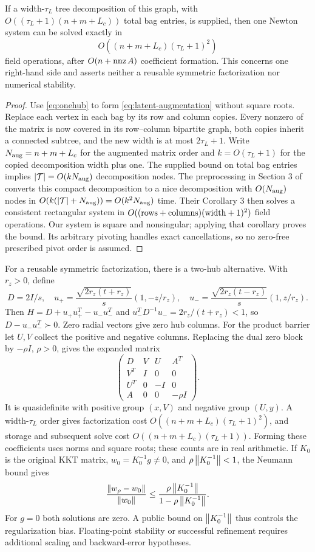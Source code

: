 \begin{proposition}\label{prop:latent-width}
If a width-$\tau_L$ tree decomposition of this graph, with
$O((\tau_L+1)(n+m+L_c))$ total bag entries, is supplied, then one Newton
system can be solved exactly in
\[
                 O((n+m+L_c)(\tau_L+1)^2)
\]
field operations, after $O(n+\operatorname{nnz} A)$ coefficient formation. This
concerns one right-hand side and asserts neither a reusable symmetric
factorization nor numerical stability.
\end{proposition}
\begin{proof}
Use \eqref{eq:onehub} to form \eqref{eq:latent-augmentation} without
square roots. Replace each vertex in each bag by its row and column
copies. Every nonzero of the matrix is now covered in its row--column
bipartite graph, both copies inherit a connected subtree, and the new
width is at most $2\tau_L+1$. Write $N_{\rm aug}=n+m+L_c$ for the
augmented matrix order and $k=O(\tau_L+1)$ for the copied decomposition
width plus one. The supplied bound on total bag entries implies
$|\mathcal T|=O(kN_{\rm aug})$ decomposition nodes.
The preprocessing in Section 3 of \citet{FurerHoppenTrevisan2025}
converts this compact decomposition to a nice decomposition with
$O(N_{\rm aug})$ nodes in
$O(k(|\mathcal T|+N_{\rm aug}))=O(k^2N_{\rm aug})$ time.
Their Corollary 3 then solves a consistent rectangular
system in $O((\hbox{rows}+\hbox{columns})(\hbox{width}+1)^2)$ field
operations. Our system is square and nonsingular; applying that corollary
proves the bound. Its arbitrary pivoting handles exact cancellations,
so no zero-free prescribed pivot order is assumed.
\end{proof}

For a reusable symmetric factorization, there is a two-hub alternative.
With $r_z>0$, define
\[
 D=2I/s,\quad
 u_+=\frac{\sqrt{2r_z(t+r_z)}}s(1,-z/r_z),\quad
 u_-=\frac{\sqrt{2r_z(t-r_z)}}s(1,z/r_z).
\]
Then $H=D+u_+u_+^T-u_-u_-^T$ and
$u_-^TD^{-1}u_-=2r_z/(t+r_z)<1$, so $D-u_-u_-^T\succ0$.
Zero radial vectors give zero hub columns. For the product barrier let
$U,V$ collect the positive and negative columns. Replacing the dual zero
block by $-\rho I$, $\rho>0$, gives the expanded matrix
\[
 \begin{pmatrix}
 D&V&U&A^T\\V^T&I&0&0\\U^T&0&-I&0\\A&0&0&-\rho I
 \end{pmatrix}.
\]
It is quasidefinite with positive group $(x,V)$ and negative group $(U,y)$.
A width-$\tau_L$ order gives factorization cost
$O((n+m+L_c)(\tau_L+1)^2)$, and storage and subsequent solve cost
$O((n+m+L_c)(\tau_L+1))$. Forming these coefficients uses norms and square
roots; these counts are in real arithmetic. If $K_0$ is the original KKT
matrix, $w_0=K_0^{-1}g\ne0$, and $\rho\left\lVert K_0^{-1}\right\rVert<1$, the Neumann
bound gives
\[
 \frac{\left\lVert w_\rho-w_0\right\rVert}{\left\lVert w_0\right\rVert}
 \leq\frac{\rho\left\lVert K_0^{-1}\right\rVert}{1-\rho\left\lVert K_0^{-1}\right\rVert}.
\]
For $g=0$ both solutions are zero. A public bound on
$\left\lVert K_0^{-1}\right\rVert$ thus controls the regularization bias.
Floating-point stability or successful refinement requires additional
scaling and backward-error hypotheses.

